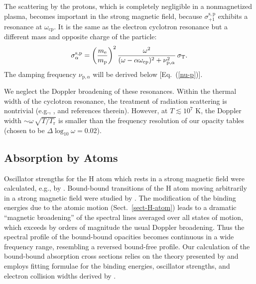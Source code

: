 \documentclass{emulateapj}
\newcommand{\beq}{\begin{equation}}
\newcommand{\eeq}{\end{equation}}
\newcommand{\req}[1]{Eq.\ (\ref{#1})}
\newcommand{\mel}{m_\mathrm{e}}
\newcommand{\mpr}{m_\mathrm{p}}
\newcommand{\omp}{\omega_\mathrm{cp}}
\begin{document}
The scattering by the protons, which is completely negligible
in a nonmagnetized plasma, becomes important in the strong
magnetic field, because $\sigma_{+1}^\mathrm{s,p}$
exhibits a resonance at $\omp$. It 
is the same as the electron cyclotron resonance but a different
mass and opposite charge 
of the particle:
\beq
    \sigma_\alpha^\mathrm{s,p} =
      \left( \frac{\mel}{\mpr}\right)^2
          {\omega^2\over(\omega-\alpha\omp)^2
             +\nu_{\mathrm{p},\alpha}^2}\, \sigma_\mathrm{T}.
\label{sigma-sp}
\eeq
The damping frequency $\nu_{\mathrm{p},\alpha}$ will be derived below
[\req{nu-p}].

We neglect the Doppler broadening of these resonances.
Within the thermal width of the cyclotron resonance,
the treatment of radiation scattering is nontrivial
(e.g., \citealp{Ventura-ea85},
and references therein). However,
at $T\lesssim10^7$ K, the Doppler width $\sim\omega\,\sqrt{T/T_\mathrm{r}}$
is smaller than the frequency resolution of our opacity tables
(chosen to be $\Delta\log_{10}\omega=0.02$).

        \subsection{Absorption by Atoms}
\label{sect-bb+bf}

Oscillator strengths for the H atom which rests in a strong 
magnetic field 
were calculated, e.g., by \citet{Forster}.
Bound-bound transitions of the H atom moving arbitrarily
in a strong magnetic field were studied 
by \citet{PP95}.
The modification of the binding
energies due to the atomic motion (Sect.\ \ref{sect-H-atom}) leads to 
a dramatic ``magnetic broadening'' of the spectral lines
averaged over all states of motion,
which exceeds by orders of magnitude the usual Doppler broadening.
Thus the spectral profile of the 
 bound-bound opacities becomes continuous in a wide frequency range,
 resembling a reversed bound-free profile. 
 Our calculation of the bound-bound absorption cross sections
 relies on the theory presented by \citet{PP95}
and employs fitting formulae for the binding energies,
 oscillator strengths,
 and electron collision widths derived by \citet{P98}.
\end{document}

